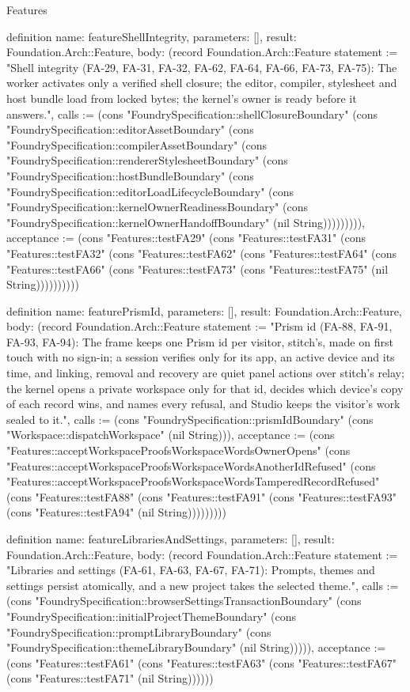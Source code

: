 \begin{lexlean}{Features}
\begin{semanticmodule}
definition{
  name: featureShellIntegrity,
  parameters: [],
  result: Foundation.Arch::Feature,
  body: (record Foundation.Arch::Feature {statement := "Shell integrity (FA-29, FA-31, FA-32, FA-62, FA-64, FA-66, FA-73, FA-75): The worker activates only a verified shell closure; the editor, compiler, stylesheet and host bundle load from locked bytes; the kernel's owner is ready before it answers.", calls := (cons "FoundrySpecification::shellClosureBoundary" (cons "FoundrySpecification::editorAssetBoundary" (cons "FoundrySpecification::compilerAssetBoundary" (cons "FoundrySpecification::rendererStylesheetBoundary" (cons "FoundrySpecification::hostBundleBoundary" (cons "FoundrySpecification::editorLoadLifecycleBoundary" (cons "FoundrySpecification::kernelOwnerReadinessBoundary" (cons "FoundrySpecification::kernelOwnerHandoffBoundary" (nil String))))))))), acceptance := (cons "Features::testFA29" (cons "Features::testFA31" (cons "Features::testFA32" (cons "Features::testFA62" (cons "Features::testFA64" (cons "Features::testFA66" (cons "Features::testFA73" (cons "Features::testFA75" (nil String)))))))))})
}

definition{
  name: featurePrismId,
  parameters: [],
  result: Foundation.Arch::Feature,
  body: (record Foundation.Arch::Feature {statement := "Prism id (FA-88, FA-91, FA-93, FA-94): The frame keeps one Prism id per visitor, stitch's, made on first touch with no sign-in; a session verifies only for its app, an active device and its time, and linking, removal and recovery are quiet panel actions over stitch's relay; the kernel opens a private workspace only for that id, decides which device's copy of each record wins, and names every refusal, and Studio keeps the visitor's work sealed to it.", calls := (cons "FoundrySpecification::prismIdBoundary" (cons "Workspace::dispatchWorkspace" (nil String))), acceptance := (cons "Features::acceptWorkspaceProofsWorkspaceWordsOwnerOpens" (cons "Features::acceptWorkspaceProofsWorkspaceWordsAnotherIdRefused" (cons "Features::acceptWorkspaceProofsWorkspaceWordsTamperedRecordRefused" (cons "Features::testFA88" (cons "Features::testFA91" (cons "Features::testFA93" (cons "Features::testFA94" (nil String))))))))})
}

definition{
  name: featureLibrariesAndSettings,
  parameters: [],
  result: Foundation.Arch::Feature,
  body: (record Foundation.Arch::Feature {statement := "Libraries and settings (FA-61, FA-63, FA-67, FA-71): Prompts, themes and settings persist atomically, and a new project takes the selected theme.", calls := (cons "FoundrySpecification::browserSettingsTransactionBoundary" (cons "FoundrySpecification::initialProjectThemeBoundary" (cons "FoundrySpecification::promptLibraryBoundary" (cons "FoundrySpecification::themeLibraryBoundary" (nil String))))), acceptance := (cons "Features::testFA61" (cons "Features::testFA63" (cons "Features::testFA67" (cons "Features::testFA71" (nil String)))))})
}


\end{semanticmodule}
\end{lexlean}
